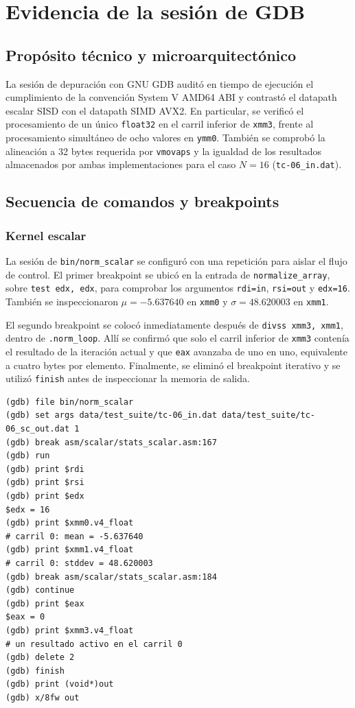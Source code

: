 \documentclass[journal]{IEEEtran}
\begin{document}
\section{Evidencia de la sesión de GDB}

\subsection{Propósito técnico y microarquitectónico}

La sesión de depuración con GNU GDB auditó en tiempo de ejecución el
cumplimiento de la convención System V AMD64 ABI y contrastó el datapath escalar
SISD con el datapath SIMD AVX2. En particular, se verificó el procesamiento de
un único \texttt{float32} en el carril inferior de \texttt{xmm3}, frente al
procesamiento simultáneo de ocho valores en \texttt{ymm0}. También se comprobó
la alineación a 32 bytes requerida por \texttt{vmovaps} y la igualdad de los
resultados almacenados por ambas implementaciones para el caso $N=16$
(\texttt{tc-06\_in.dat}).

\subsection{Secuencia de comandos y breakpoints}

\subsubsection{Kernel escalar}

La sesión de \texttt{bin/norm\_scalar} se configuró con una repetición para
aislar el flujo de control. El primer breakpoint se ubicó en la entrada de
\texttt{normalize\_array}, sobre \texttt{test edx, edx}, para comprobar los
argumentos \texttt{rdi=in}, \texttt{rsi=out} y \texttt{edx=16}. También se
inspeccionaron $\mu=-5.637640$ en \texttt{xmm0} y
$\sigma=48.620003$ en \texttt{xmm1}.

El segundo breakpoint se colocó inmediatamente después de
\texttt{divss xmm3, xmm1}, dentro de \texttt{.norm\_loop}. Allí se confirmó que
solo el carril inferior de \texttt{xmm3} contenía el resultado de la iteración
actual y que \texttt{eax} avanzaba de uno en uno, equivalente a cuatro bytes
por elemento. Finalmente, se eliminó el breakpoint iterativo y se utilizó
\texttt{finish} antes de inspeccionar la memoria de salida.

\begin{lstlisting}[caption={Comandos principales de la sesión GDB escalar.},label={lst:gdb-scalar}]
(gdb) file bin/norm_scalar
(gdb) set args data/test_suite/tc-06_in.dat data/test_suite/tc-06_sc_out.dat 1
(gdb) break asm/scalar/stats_scalar.asm:167
(gdb) run
(gdb) print $rdi
(gdb) print $rsi
(gdb) print $edx
$edx = 16
(gdb) print $xmm0.v4_float
# carril 0: mean = -5.637640
(gdb) print $xmm1.v4_float
# carril 0: stddev = 48.620003
(gdb) break asm/scalar/stats_scalar.asm:184
(gdb) continue
(gdb) print $eax
$eax = 0
(gdb) print $xmm3.v4_float
# un resultado activo en el carril 0
(gdb) delete 2
(gdb) finish
(gdb) print (void*)out
(gdb) x/8fw out
\end{lstlisting}
\end{document}
